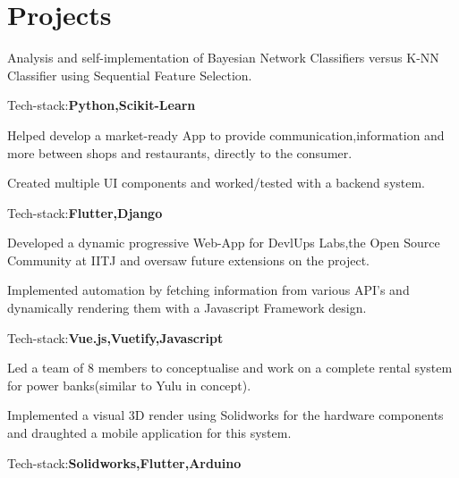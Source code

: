 \documentclass[]{deedy-resume-openfont}
\begin{document}
\begin{minipage}[t]{0.69\textwidth}
\section{Projects}
\begin{tightemize}
\item Analysis and self-implementation of Bayesian Network Classifiers versus K-NN Classifier using Sequential Feature Selection.
\item Tech-stack:\textbf{Python,Scikit-Learn}
\end{tightemize}
{}
\begin{tightemize}
\item Helped develop a market-ready App to provide communication,information and more between shops and restaurants, directly to the consumer.
\item Created multiple UI components and worked/tested with a backend system.
\item Tech-stack:\textbf{Flutter,Django}
\end{tightemize}
{}
\begin{tightemize}
\item Developed a dynamic progressive Web-App for DevlUps Labs,the Open Source Community at IITJ and oversaw future extensions on the project. 
\item Implemented automation by fetching information from various API's and dynamically rendering them with a Javascript Framework design. 
\item Tech-stack:\textbf{Vue.js,Vuetify,Javascript}
\end{tightemize}
{}
\begin{tightemize}
\item Led a team of 8 members to conceptualise and work on a complete rental system for power banks(similar to Yulu in concept).
\item Implemented a visual 3D render using Solidworks for the hardware components and draughted a mobile application for this system.
\item Tech-stack:\textbf{Solidworks,Flutter,Arduino}
\end{tightemize}


\end{minipage}
\end{document}

